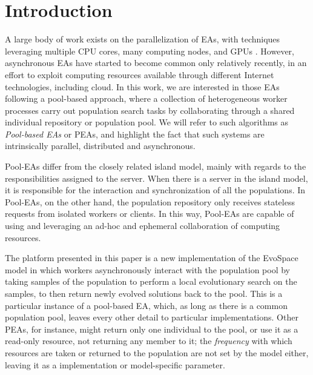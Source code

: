 \section{Introduction}
A large body of work exists on the parallelization of EAs,
with techniques leveraging multiple CPU cores, many computing nodes, 
and GPUs \cite{muhlenbein1989parallel,cantu2000efficient,hofmann2013performance}. 
However, asynchronous EAs
\cite{Jini:FEA2000,alba2001analyzing,Jini:FEA2000,jj:2008:PPSN} have
started to become common only relatively
recently, in an effort to exploit computing resources available
through different Internet technologies, including cloud. In this work, we are
interested in those EAs following a pool-based approach,
where a collection of heterogeneous worker processes 
carry out population search tasks by collaborating through a shared
individual 
repository or population pool. We will refer to such algorithms 
as {\em Pool-based EAs} or PEAs, and highlight the fact that 
such systems are intrinsically parallel, distributed and asynchronous.

Pool-EAs differ from the closely related island model, 
mainly with regards to the responsibilities assigned to 
the server. When there is a server in the island model, it is 
responsible for the interaction and synchronization of 
all the populations.  In Pool-EAs, on the other hand, the population repository only 
receives stateless requests from isolated workers 
or clients. In this way, Pool-EAs are capable of using and leveraging an 
ad-hoc and ephemeral collaboration of computing resources. 

The platform presented in this paper is a new implementation 
of the EvoSpace model \cite{GValdez2015} in which 
workers asynchronously interact with the population 
pool by taking samples of the population 
to perform a local evolutionary search on the samples, 
to then return newly evolved solutions back to the pool. This is a
particular instance of a pool-based EA, which, as long as there is a
common population pool, leaves every other detail to particular
implementations. Other PEAs, for instance, might return only one
individual to the pool, or use it as a read-only resource, not
returning any member to it; the {\em frequency} with which resources
are taken or returned to the population are not set by the model
either, leaving it as a implementation or model-specific parameter. %

